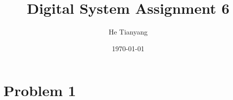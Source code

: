 \documentclass{article}
\title{Digital System Assignment 6}
\author{He Tianyang}
\date{\today}
\begin{document}
\maketitle

\section{Problem 1}
\end{document}
